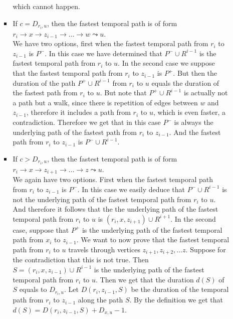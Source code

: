 \documentclass[11pt,a4paper]{article}
\theoremstyle{remark}
\theoremstyle{definition}
\begin{document}
\begin{enumerate}[(i)]
\begin{enumerate}[(a)]
\begin{itemize}
            which cannot happen.
            \item  If $c = D_{r_i,u}$, then 
            the fastest temporal path is of form $r_i \rightarrow x \rightarrow z_{i-1} \rightarrow \dots \rightarrow w \leadsto u$.\\
            We have two options, first when the fastest temporal path from $r_i$ to $z_{i-1}$ is $P^-$.
            In this case we have determined that $P^- \cup R^{i-1}$ is the fastest temporal path from $r_i$ to $u$.
            In the second case we suppose that the fastest temporal path from $r_i$ to $z_{i-1}$ is $P^+$.
            But then the duration of the path $P^+ \cup R^{i-1}$ from $r_i$ to $u$ equals the duration of the fastest path from $r_i$ to $u$. But note that $P^+ \cup R^{i-1}$ is actually not a path but a walk, since there is repetition of edges between $w$ and $z_{i-1}$,
            therefore it includes a path from $r_i$ to $u$, which is even faster,
            a contradiction.
            Therefore we get that in this case $P^-$ is always the underlying path of the fastest path from $r_i$ to $z_{i-1}$.
            And the fastest path from $r_i$ to $z_{i-1}$ is $P^- \cup R^{i-1}$.
            \item If $c > D_{r_i,u}$, then 
            the fastest temporal path is of form $r_i \rightarrow x \rightarrow z_{i+1} \rightarrow \dots \rightarrow z \leadsto u$.\\
            We again have two options.
            First when the fastest temporal path from $r_i$ to $z_{i-1}$ is $P^-$.
            In this case we easily deduce that $P^- \cup R^{i-1}$ is not the underlying path of the fastest temporal path from $r_i$ to $u$.
            And therefore it follows that the the underlying path of the fastest temporal path from $r_i$ to $u$ is  $(r_i, x, z_{i+1}) \cup R^{i+1}$.
            In the second case, suppose that $P^+$ is the underlying path of the fastest temporal path from $x_i$ to $z_{i-1}$.
            We want to now prove that the fastest temporal path from $r_i$ to $u$ travels through vertices $z_{i+1}, z_{i+2}, \dots z$.
            Suppose for the contradiction that this is not true. 
            Then $S = (r_i, x, z_{i-1}) \cup R^{i-1}$ is the underlying path of the fastest temporal path from $r_i$ to $u$.
            Then we get that the duration $d(S)$ of $S$ equals to $D_{r_i,u}$.
            Let $D(r_i,z_{i-1},S)$ be the duration of the temporal path from $r_i$ to $z_{i-1}$ along the path $S$.
            By the definition we get that $d(S) = D(r_i,z_{i-1},S) + D_{x,u} - 1$.

\end{itemize}
\end{enumerate}
\end{enumerate}
\end{document}
